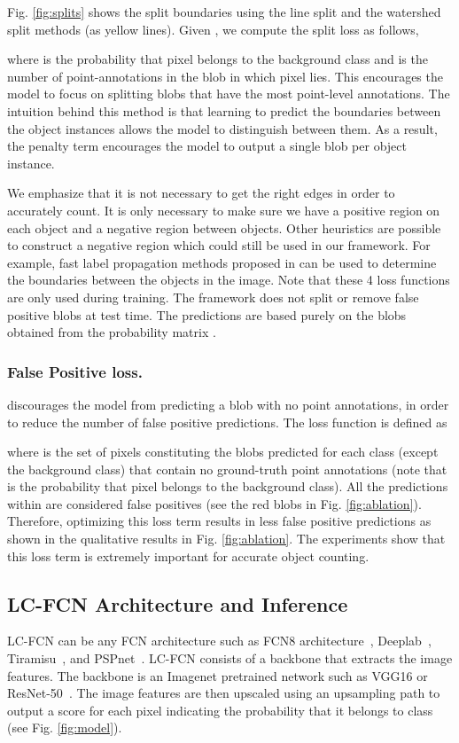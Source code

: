 \documentclass[runningheads]{llncs}
\begin{document}
Fig. \ref{fig:splits} shows the split boundaries using the line split and the watershed split methods  (as yellow lines). Given , we compute the split loss as follows,


where  is the probability that pixel  belongs to the background class and  is the number of point-annotations in the blob in which pixel  lies. This encourages the model to focus on splitting blobs that have the most point-level annotations. The intuition behind this method is that learning to predict the boundaries between the object instances allows the model to distinguish between them. As a result, the penalty term encourages the model to output a single blob per object instance. 

We emphasize that it is not necessary to get the right edges in order to accurately count. It is only necessary to make sure we have a positive region on each object and a negative region between objects. Other heuristics are possible to construct a negative region which could still be used in our framework. For example, fast label propagation methods proposed in \cite{nutini2017let,nutini2016convergence} can be used to determine the boundaries between the objects in the image. Note that these 4 loss functions are only used during training. The framework does not split or remove false positive blobs at test time. The predictions are based purely on the blobs obtained from the probability matrix .






\subsubsection{False Positive loss.}  discourages the model from predicting a blob with no point annotations, in order to reduce the number of false positive predictions. The loss function is defined as


where  is the set of pixels constituting the blobs predicted for each class (except the background class) that contain no ground-truth point annotations (note that  is the probability that pixel  belongs to the background class). All the predictions within  are considered false positives (see the red blobs in Fig. \ref{fig:ablation}). Therefore, optimizing this loss term results in less false positive predictions as shown in the qualitative results in Fig. \ref{fig:ablation}. The experiments show that this loss term is extremely important for accurate object counting.

\subsection{LC-FCN Architecture and Inference}
LC-FCN can be any FCN architecture such as FCN8 architecture~\cite{long2015fully}, Deeplab~\cite{chen2016deeplab}, Tiramisu~\cite{jegou2017one}, and PSPnet~\cite{zhao2017pyramid}. LC-FCN consists of a backbone that extracts the image features. The backbone is an Imagenet pretrained network such as VGG16 or ResNet-50~\cite{simonyan2014very,imagenet_cvpr09}. The image features are then upscaled using an upsampling path to output a score for each pixel  indicating the probability that it belongs to class  (see Fig. \ref{fig:model}). 
\end{document}
